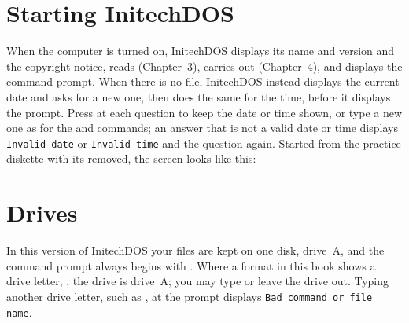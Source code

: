 \section{Starting InitechDOS}
When the computer is turned on, InitechDOS displays its name and version
and the copyright notice, reads  (Chapter~3), carries out
 (Chapter~4), and displays the command prompt.  When
there is no  file, InitechDOS instead displays the
current date and asks for a new one, then does the same for the time,
before it displays the prompt.  Press  at each question to keep
the date or time shown, or type a new one as for the  and
 commands; an answer that is not a valid date or time displays
\texttt{Invalid date} or \texttt{Invalid time} and the question again.
Started from the practice diskette with its  removed,
the screen looks like this:

\section{Drives}
In this version of InitechDOS your files are kept on one disk, drive~A, and
the command prompt always begins with .  Where a format in this
book shows a drive letter, \kw{:}, the drive is drive~A; you may
type  or leave the drive out.  Typing another drive letter, such
as , at the prompt displays \texttt{Bad command or file name}.
